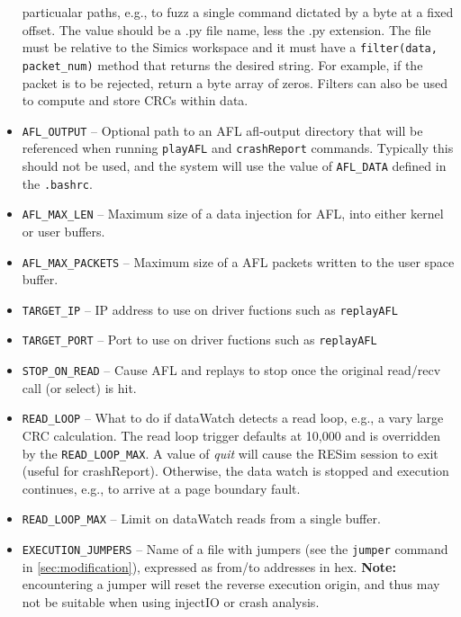 \documentclass[titlepage]{article}
\begin{document}
\begin{itemize}
particualar paths, e.g., to fuzz a single command dictated by a byte at a fixed offset.  The value should be a .py file name, less the
.py extension.  The file must be relative to the Simics workspace and it must have a {\tt filter(data, packet\_num)} method that returns
the desired string.  For example, if the packet is to be rejected, return a byte array of zeros.  Filters can also be used to 
compute and store CRCs within data.  
\item {\tt AFL\_OUTPUT} -- Optional path to an AFL afl-output directory that will be referenced when running {\tt playAFL} and {\tt crashReport} commands. Typically this should not be used, and the system will use the value of {\tt AFL\_DATA} defined in the {\tt .bashrc}.
\item {\tt AFL\_MAX\_LEN} -- Maximum size of a data injection for AFL, into either kernel or user buffers.
\item {\tt AFL\_MAX\_PACKETS} -- Maximum size of a AFL packets written to the user space buffer.

\item {\tt TARGET\_IP} -- IP address to use on driver fuctions such as {\tt replayAFL}
\item {\tt TARGET\_PORT} -- Port to use on driver fuctions such as {\tt replayAFL}
\item {\tt STOP\_ON\_READ} -- Cause AFL and replays to stop once the original read/recv call (or select) is hit.
\item {\tt READ\_LOOP} -- What to do if dataWatch detects a read loop, e.g., a vary large CRC calculation.  The read loop trigger defaults at 10,000
and is overridden by the {\tt READ\_LOOP\_MAX}.  A value of \textit{quit} will cause
the RESim session to exit (useful for crashReport).  Otherwise, the data watch is stopped and execution continues, e.g., to arrive at a page boundary fault.
\item {\tt READ\_LOOP\_MAX} -- Limit on dataWatch reads from a single buffer.
\item {\tt EXECUTION\_JUMPERS} -- Name of a file with jumpers (see the {\tt jumper} command in \ref{sec:modification}), expressed as 
from/to addresses in hex.  \textbf{Note:} encountering
a jumper will reset the reverse execution origin, and thus may not be suitable when using injectIO or crash analysis.

\end{itemize}
\end{document}
